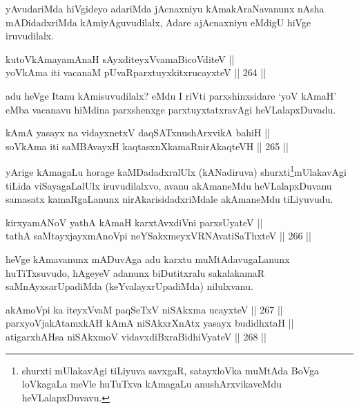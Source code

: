 \begin{artha}
yAvudariMda hiVgideyo adariMda jAcnaxniyu kAmakAraNavanunx nAsha mADidadxriMda kAmiyAguvudilalx, Adare ajAcnaxniyu eMdigU hiVge iruvudilalx.
\end{artha}

\begin{shl}
kutoV\s kAmayamAnaH sAyxditeyxVvamaBicoVditeV || \\
yoV\s kAma iti vacanaM pUvaRparxtuyxkitxrucayxteV ||  264 ||  
\end{shl}

\begin{artha}
adu heVge Itanu kAmisuvudilalx? eMdu I riVti parxshinxsidare `yoV\s
kAmaH' eMba vacanavu hiMdina parxshenxge parxtuyxtatxravAgi heVLalapxDuvadu.
\end{artha}


\begin{shl}
kAmA yasayx na vidayxnetxV daqSATxnushArxvikA bahiH || \\
soV\s kAma iti saMBAvayxH kaqtasxnXkamaRnirAkaqteVH ||  265 ||   
\end{shl}

\begin{artha}
yArige kAmagaLu horage kaMDadadxralUlx (kANadiruva) shurxti\footnote{shurxti mUlakavAgi tiLiyuva savxgaR, satayxloVka muMtAda
BoVga loVkagaLa meVle huTuTxva kAmagaLu anushArxvikaveMdu
heVLalapxDuvavu.}mUlakavAgi tiLida viSayagaLalUlx iruvudilalxvo, avanu akAmaneMdu
heVLalapxDuvanu samasatx kamaRgaLanunx nirAkarisidadxriMdale
akAmaneMdu tiLiyuvudu.
\end{artha}

\begin{shl}
kirxyamANoV yathA kAmaH karxtAvxdiVni parxsUyateV || \\
tathA saMtayxjayxmAnoV\s pi neYSakxmeyxVRNAvatiSaThxteV ||  266 ||  
\end{shl}

\begin{artha}
heVge kAmavanunx mADuvAga adu karxtu muMtAdavugaLanunx huTiTxsuvudo,
hAgeyeV adanunx biDutitxralu sakalakamaR saMnAyxsarUpadiMda
(keYvalayxrUpadiMda) nilulxvanu.
\end{artha}


\begin{shl}
akAmoV\s pi ka iteyxVvaM paqSeTxV niSAkxma ucayxteV ||  267 ||  \\
parxyoVjakAtamxkAH kAmA niSAkxrXnAtx yasayx budidhxtaH || \\
atigarxhAH\footnotemark[2] sa niSAkxmoV vidavxdiBxraBidhiVyateV ||  268 ||  
\end{shl}

